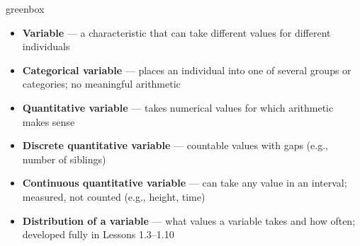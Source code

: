 \documentclass[10pt]{article}
\begin{document}
\begin{skillbox}{greenbox}
\begin{minipage}[t]{0.48\linewidth}
    \begin{itemize}
        \item \textbf{Variable} --- a characteristic that can take different values
              for different individuals
        \item \textbf{Categorical variable} --- places an individual into one of
              several groups or categories; no meaningful arithmetic
        \item \textbf{Quantitative variable} --- takes numerical values for which
              arithmetic makes sense
    \end{itemize}
\end{minipage}
\hfill
\begin{minipage}[t]{0.48\linewidth}
    \begin{itemize}
        \item \textbf{Discrete quantitative variable} --- countable values with
              gaps (e.g., number of siblings)
        \item \textbf{Continuous quantitative variable} --- can take any value in
              an interval; measured, not counted (e.g., height, time)
        \item \textbf{Distribution of a variable} --- what values a variable takes
              and how often; developed fully in Lessons 1.3--1.10
    \end{itemize}
\end{minipage}
\end{skillbox}
\end{document}
